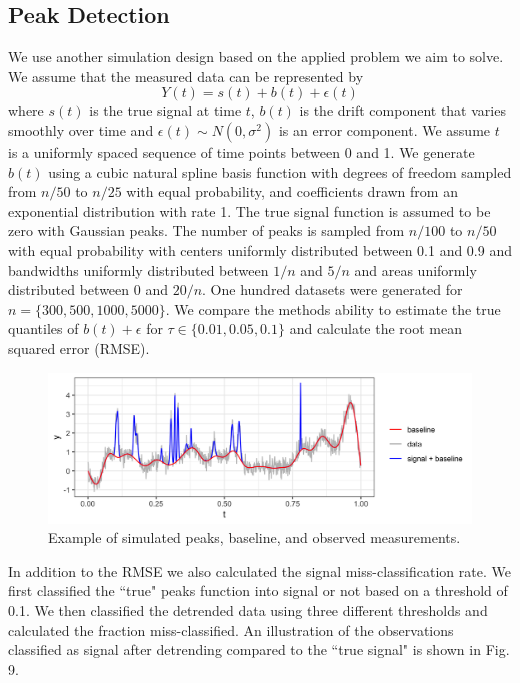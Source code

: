 \documentclass[12pt]{article}
\begin{document}
	\subsection{Peak Detection}
	We use another simulation design based on the applied problem we aim to solve. We assume that the measured data can be represented by 
	\begin{equation}
	Y(t) = s(t) + b(t) + \epsilon(t)
	\end{equation} 
	where $s(t)$ is the true signal at time $t$, $b(t)$ is the drift component that varies smoothly over time and $\epsilon(t) \sim N(0, \sigma^2)$ is an error component. We assume $t$ is a uniformly spaced sequence of time points between 0 and 1. We generate $b(t)$ using a cubic natural spline basis function with degrees of freedom sampled from $n/50$ to $n/25$ with equal probability, and coefficients drawn from an exponential distribution with rate 1. The true signal function is assumed to be zero with Gaussian peaks. The number of peaks is sampled from $n/100$ to $n/50$ with equal probability with centers uniformly distributed between 0.1 and 0.9 and bandwidths uniformly distributed between $1/n$ and $5/n$ and areas uniformly distributed between 0 and $20/n$. One hundred datasets were generated for $n=\{300, 500, 1000, 5000\}$. We compare the methods ability to estimate the true quantiles of $b(t) + \epsilon$  for $\tau \in \{0.01, 0.05, 0.1\}$ and calculate the root mean squared error (RMSE). 
	
	\begin{figure}[h]
		\caption{Example of simulated peaks, baseline, and observed measurements.}
		\includegraphics[width = \linewidth]{Figures/ex_peaks.png}
	\end{figure}

	In addition to the RMSE we also calculated the signal miss-classification rate. We first classified the ``true" peaks function into signal or not based on a threshold of 0.1. We then classified the detrended data using three different thresholds and calculated the fraction miss-classified. An illustration of the observations classified as signal after detrending compared to the ``true signal" is shown in Fig. 9. 
	
\end{document}
